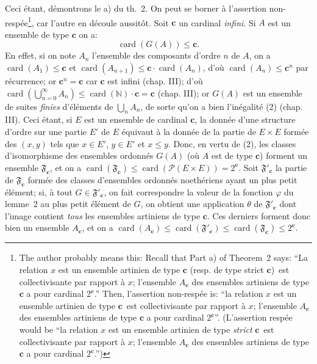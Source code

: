 \documentclass[12pt]{article}
\newcommand{\card}{\operatorname{card}}
\newcommand{\NN}{\mathbb N}
\begin{document}
Ceci étant, démontrons le a) du th.~2. On peut se borner à l'assertion non-respée\footnote{The author probably means this: Recall that Part a) of Theorem~2 says: ``La relation \og$x$ est un ensemble artinien de type $\mathbf c$ (resp. de type strict $\mathbf c$)\fg\ est collectivisante par rapport à $x$; l'ensemble $A_{\mathbf c}$ des ensembles artiniens de type $\mathbf c$ a pour cardinal $2^{\mathbf c}$.'' Then, l'assertion non-respée is: ``la relation \og$x$ est un ensemble artinien de type $\mathbf c$\fg\ est collectivisante par rapport à $x$; l'ensemble $A_{\mathbf c}$ des ensembles artiniens de type $\mathbf c$ a pour cardinal $2^{\mathbf c}$''. (L'assertion respée would be ``la relation \og$x$ est un ensemble artinien de type \emph{strict} $\mathbf c$\fg\ est collectivisante par rapport à $x$; l'ensemble $A_{\mathbf c}$ des ensembles artiniens de type $\mathbf c$ a pour cardinal $2^{\mathbf c}$.'')}, car l'autre en découle aussitôt. Soit $\mathbf c$ un cardinal \emph{infini}. Si $A$ est un ensemble de type $\mathbf c$ on a:
\begin{equation*}
\card(G(A))\leq\mathbf c.\tag{2}
\end{equation*}
En effet, si on note $A_n$ l'ensemble des composants d'ordre $n$ de $A$, on a $\card(A_1)\leq \mathbf c$ et $\card(A_{n+1})\leq\mathbf c\cdot \card(A_n)$, d'où $\card(A_n)\leq\mathbf c^n$ par récurrence; or $\mathbf c^n=\mathbf c$ car $\mathbf c$ est infini (chap. III); d'où $\card(\bigcup^\infty_{n=0} A_n)\leq\card(\NN)\cdot \mathbf c=\mathbf c$ (chap. III); or $G(A)$ est un ensemble de suites \emph{finies} d'éléments de
$\bigcup_n A_n$, de sorte qu'on a bien l'inégalité (2) (chap. III). Ceci étant, si $E$ est un ensemble de cardinal $\mathbf c$, la donnée d'une structure d'ordre sur une partie $E'$ de $E$ équivaut à la donnée de la partie de $E\times E$ formée des $(x,y)$ tels que $x\in E'$, $y\in E'$ et $x\leq y$. Donc, en vertu de (2), les classes d'isomorphisme des ensembles ordonnés $G(A)$ (où $A$ est de type $\mathbf c$) forment un ensemble $\mathfrak{F}_{\mathbf c}$, et on a $\card(\mathfrak{F}_{\mathbf c})\leq\card(\mathcal{P}(E\times E))=2^{\mathbf c}$. Soit $\mathfrak{F}'_{\mathbf c}$ la partie de $\mathfrak{F}_{\mathbf c}$ formée des classes d'ensembles ordonnés noethériens ayant un plus petit élément; si, à tout $G\in\mathfrak{F}'_{\mathbf c}$, on fait correspondre la valeur de la fonction $\varphi$ du lemme~2 au plus petit élément de $G$, on obtient une application $\theta$ de $\mathfrak{F}'_{\mathbf c}$ dont l'image contient \emph{tous} les ensembles artiniens de type $\mathbf c$. Ces derniers forment donc bien un ensemble $A_{\mathbf c}$, et on a $\card(A_{\mathbf c})\leq\card(\mathfrak{F}'_{\mathbf c})\leq\card(\mathfrak{F}_{\mathbf c})\leq 2^{\mathbf c}$.
\end{document}
